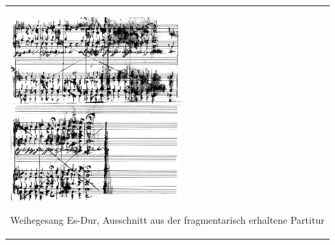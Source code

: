 \begin{center}
\begin{minipage}{6.969cm}
\begin{center}
\tablefirsthead{}
\tablehead{}
\tabletail{}
\tablelasttail{}
\begin{supertabular}{m{6.769cm}}

\includegraphics[width=6.588cm,height=7.084cm]{pictures/zulassungsarbeit-img102.png}

Weihegesang Es-Dur, Ausschnitt aus der
fragmentarisch erhaltene Partitur\\
\end{supertabular}
\end{center}
\end{minipage}
\end{center}

\begin{figure}
\img{}
\caption{}
\end{figure}

